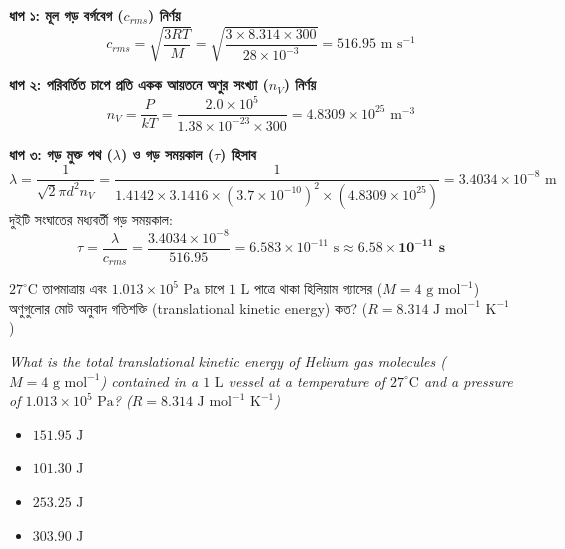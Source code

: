 \documentclass[12pt, a4paper]{article}
\begin{document}
\begin{tcolorbox}[solutionbox={সমাধান (Solution)}]
    \noindent
    \textbf{ধাপ ১: মূল গড় বর্গবেগ ($c_{rms}$) নির্ণয়}
    \[ c_{rms} = \sqrt{\frac{3 R T}{M}} = \sqrt{\frac{3 \times 8.314 \times 300}{28 \times 10^{-3}}} = 516.95\text{ m s}^{-1} \]
    
    \vspace{0.4em}
    \noindent\textbf{ধাপ ২: পরিবর্তিত চাপে প্রতি একক আয়তনে অণুর সংখ্যা ($n_V$) নির্ণয়}
    \[ n_V = \frac{P}{k T} = \frac{2.0 \times 10^5}{1.38 \times 10^{-23} \times 300} = 4.8309 \times 10^{25}\text{ m}^{-3} \]
    
    \vspace{0.4em}
    \noindent\textbf{ধাপ ৩: গড় মুক্ত পথ ($\lambda$) ও গড় সময়কাল ($\tau$) হিসাব}
    \[ \lambda = \frac{1}{\sqrt{2} \pi d^2 n_V} = \frac{1}{1.4142 \times 3.1416 \times (3.7 \times 10^{-10})^2 \times (4.8309 \times 10^{25})} = 3.4034 \times 10^{-8}\text{ m} \]
    দুইটি সংঘাতের মধ্যবর্তী গড় সময়কাল:
    \[ \tau = \frac{\lambda}{c_{rms}} = \frac{3.4034 \times 10^{-8}}{516.95} = 6.583 \times 10^{-11}\text{ s} \approx \mathbf{6.58 \times 10^{-11}\text{ s}} \]
\end{tcolorbox}
\begin{tcolorbox}[questionbox={প্রশ্ন (Question) 25}]
    \noindent
    $27^\circ\text{C}$ তাপমাত্রায় এবং $1.013 \times 10^5\text{ Pa}$ চাপে $1\text{ L}$ পাত্রে থাকা হিলিয়াম গ্যাসের ($M = 4\text{ g mol}^{-1}$) অণুগুলোর মোট অনুবাদ গতিশক্তি (translational kinetic energy) কত? ($R = 8.314\text{ J mol}^{-1}\text{ K}^{-1}$)
    
    \vspace{0.8em}
    \begin{english}
    \noindent\textit{\color{darkgray}
    What is the total translational kinetic energy of Helium gas molecules ($M = 4\text{ g mol}^{-1}$) contained in a $1\text{ L}$ vessel at a temperature of $27^\circ\text{C}$ and a pressure of $1.013 \times 10^5\text{ Pa}$? ($R = 8.314\text{ J mol}^{-1}\text{ K}^{-1}$)
    }
    \end{english}
\end{tcolorbox}

\begin{itemize}[label={}, leftmargin=1cm, itemsep=0.5em]
    \item[\textbf{A)}] $151.95\text{ J}$
    \item[\textbf{B)}] $101.30\text{ J}$
    \item[\textbf{C)}] $253.25\text{ J}$
    \item[\textbf{D)}] $303.90\text{ J}$
\end{itemize}
\end{document}
